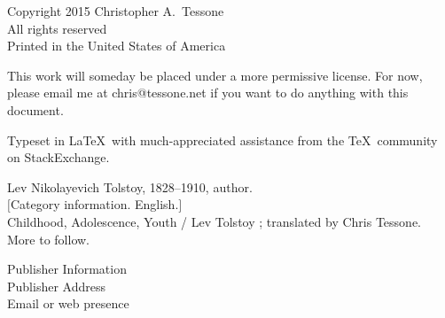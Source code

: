 \begingroup 
\footnotesize 
\parindent 0pt 
\parskip \baselineskip 
Copyright \textcopyright{} 2015 Christopher A.~Tessone \\
All rights reserved \\
Printed in the United States of America %

This work will someday be placed under a more permissive license. For 
now, please email me at chris@tessone.net if you want to do anything 
with this document. 

Typeset in \LaTeX\ with much-appreciated assistance from the \TeX\
community on StackExchange. %


Lev Nikolayevich Tolstoy, 1828--1910, author. \\
$[$Category information. English.$]$ \\
Childhood, Adolescence, Youth / Lev Tolstoy ; translated by Chris 
Tessone. \\
More to follow. 

\vfill 

Publisher Information\\
Publisher Address\\
Email or web presence 

\endgroup 
\pagestyle{empty}
\clearpage 
